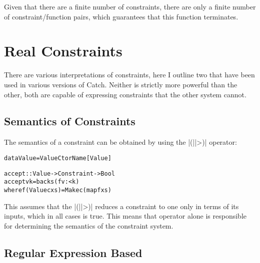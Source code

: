 \documentclass[preprint]{sigplanconf}
\newenvironment{code}{\begin{alltt}\small}{\end{alltt}}
\begin{document}
Given that there are a finite number of constraints, there are only a finite number of constraint/function pairs, which guarantees that this function terminates.


\section{Real Constraints}
\label{sec:constraint}

There are various interpretations of constraints, here I outline two that have been used in various versions of Catch. Neither is strictly more powerful than the other, both are capable of expressing constraints that the other system cannot.

\subsection{Semantics of Constraints}

The semantics of a constraint can be obtained by using the |(||>)| operator:

\begin{code}
data Value = Value CtorName [Value]

accept :: Value -> Constraint -> Bool
accept v k = backs (f v :< k)
    where f (Value c xs) = Make c (map f xs)
\end{code}

This assumes that the |(||>)| reduces a constraint to one only in terms of its inputs, which in all cases is true. This means that operator alone is responsible for determining the semantics of the constraint system.


\subsection{Regular Expression Based}
\end{document}
